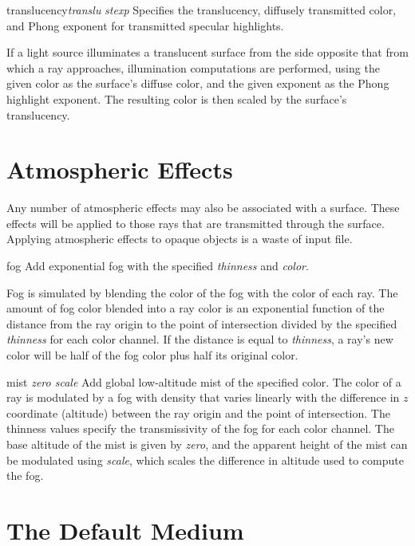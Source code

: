 \begin{defkey}{translucency}{{\em translu}  {\em stexp}}
	Specifies the translucency, diffusely transmitted color,
	and Phong exponent for transmitted specular highlights.
\end{defkey}
If a light source illuminates a translucent surface from the side opposite
that from which a ray approaches, illumination computations are performed,
using the given color as the surface's diffuse color, and the given
exponent as the Phong highlight exponent.  The resulting color is then
scaled by the surface's translucency.

\section{Atmospheric Effects}

Any number of atmospheric effects may also be associated with a surface.
These effects will be applied to those rays that are transmitted through
the surface.  Applying atmospheric effects to opaque objects is a waste
of input file.

\begin{defkey}{fog}{ }
Add exponential fog with the specified {\em thinness} and {\em color}.
\end{defkey}
Fog is simulated by blending the color of the fog with the color of
each ray.  The amount of fog color blended into a ray color is an exponential
function of the distance from the ray origin to the point of intersection
divided by the specified {\em thinness} for each color channel.
If the distance is equal to {\em thinness},
a ray's new color will be half of the fog color plus half its
original color.

\begin{defkey}{mist}{  {\em zero scale}}
Add global low-altitude mist of the specified color.  The color of
a ray is modulated by a fog with density that varies linearly with
the difference in $z$ coordinate (altitude) between the ray origin and
the point of intersection.  The thinness values specify the transmissivity
of the fog for each color channel.
The base altitude of the
mist is given by {\em zero}, and the apparent height of the mist can
be modulated using {\em scale}, which scales the difference in
altitude used to compute the fog.
\end{defkey}

\section {The Default Medium}

